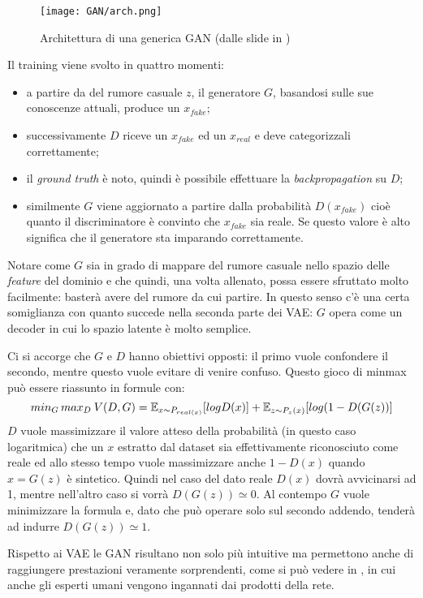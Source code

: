 \begin{figure}[ht]
  \centering
  \texttt{[image: GAN/arch.png]}
  \caption{Architettura di una generica GAN (dalle slide in \cite{MIT_GEN})}
  \label{fig:gan}
\end{figure}
\noindent
Il training viene svolto in quattro momenti:
\begin{itemize}
  \item a partire da del rumore casuale $z$, il generatore $G$, basandosi sulle sue conoscenze attuali, produce un $x_{fake}$;
  \item successivamente $D$ riceve un $x_{fake}$ ed un $x_{real}$ e deve categorizzali correttamente;
  \item il \emph{ground truth} è noto, quindi è possibile effettuare la \emph{backpropagation} su $D$;
  \item similmente $G$ viene aggiornato a partire dalla probabilità $D(x_{fake})$ cioè quanto il discriminatore è convinto che $x_{fake}$ sia reale.
    Se questo valore è alto significa che il generatore sta imparando correttamente.
\end{itemize}
Notare come $G$ sia in grado di mappare del rumore casuale nello spazio delle \emph{feature} del dominio e che quindi, una volta allenato, possa essere sfruttato molto facilmente: basterà avere del rumore da cui partire.
In questo senso c'è una certa somiglianza con quanto succede nella seconda parte dei VAE: $G$ opera come un decoder in cui lo spazio latente è molto semplice.

Ci si accorge che $G$ e $D$ hanno obiettivi opposti: il primo vuole confondere il secondo, mentre questo vuole evitare di venire confuso.
Questo gioco di minmax può essere riassunto in  formule con:
$$
min_G \, max_D \: V(D,G) = \mathbb{E}_{x \sim P_{real(x)}} [ log D(x) ] 
+
\mathbb{E}_{z \sim P_z(x)} [ log ( 1 - D(G(z)) ]
$$
$D$ vuole massimizzare il valore atteso della probabilità (in questo caso logaritmica) che un $x$ estratto dal dataset sia effettivamente riconosciuto come reale ed allo stesso tempo vuole massimizzare anche $ 1 - D(x)$ quando $x=G(z)$ è sintetico.
Quindi nel caso del dato reale $D(x)$ dovrà avvicinarsi ad 1, mentre nell'altro caso si vorrà $D(G(z)) \simeq 0$.
Al contempo $G$ vuole minimizzare la formula e, dato che può operare solo sul secondo addendo, tenderà ad indurre $D(G(z)) \simeq 1$.

Rispetto ai VAE le GAN risultano non solo più intuitive ma permettono anche di raggiungere prestazioni veramente sorprendenti, come si può vedere in \cite{GAN_HD}, in cui anche gli esperti umani vengono ingannati dai prodotti della rete.

